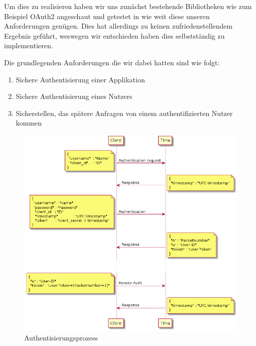 Um dies zu realisieren haben wir uns zunächst bestehende Bibliotheken wie zum Beispiel OAuth2 angeschaut und getestet in wie weit diese unseren Anforderungen genügen. Dies hat allerdings zu keinen zufriedenstellendem Ergebnis geführt, weswegen wir entschieden haben dies selbstständig zu implementieren.

Die grundlegenden Anforderungen die wir dabei hatten sind wie folgt:
\begin{enumerate}
	\item Sichere Authentisierung einer Applikation
	\item Sichere Authentisierung eines Nutzers
	\item Sicherstellen, das spätere Anfragen von einem authentifizierten Nutzer kommen
\end{enumerate}

\begin{figure}[!h]
	\centering
	\includegraphics[width=\textwidth]{images/auth.png}
	\caption{Authentisierungsprozess}
	\label{fig:auth}
\end{figure}

